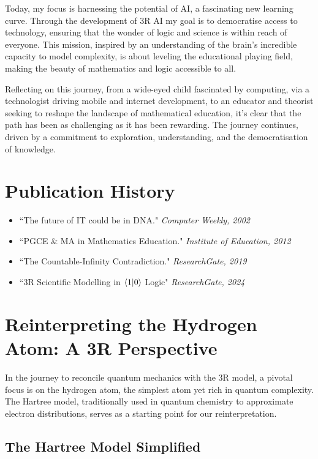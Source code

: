 \documentclass[12pt]{article}
\begin{document}
Today, my focus is harnessing the potential of AI, a fascinating new learning curve. Through the development of 3R AI my goal is to democratise access to technology, ensuring that the wonder of logic and science is within reach of everyone. This mission, inspired by an understanding of the brain's incredible capacity to model complexity, is about leveling the educational playing field, making the beauty of mathematics and logic accessible to all.

Reflecting on this journey, from a wide-eyed child fascinated by computing, via a technologist driving mobile and internet development, to an educator and theorist seeking to reshape the landscape of mathematical education, it's clear that the path has been as challenging as it has been rewarding. The journey continues, driven by a commitment to exploration, understanding, and the democratisation of knowledge.

\section*{Publication History}
\begin{itemize}
    \item \rDNA{} ``The future of IT could be in DNA." \textit{Computer Weekly, 2002}
    \item \rIoE{} ``PGCE \& MA in Mathematics Education." \textit{Institute of Education, 2012}
    \item \rCIC{} ``The Countable-Infinity Contradiction." \textit{ResearchGate, 2019}
    \item \rR{} ``3R Scientific Modelling in \(\langle 1 | 0 \rangle\) Logic" \textit{ResearchGate, 2024}
\end{itemize}


\section{Reinterpreting the Hydrogen Atom: A 3R Perspective}

In the journey to reconcile quantum mechanics with the 3R model, a pivotal focus is on the hydrogen atom, the simplest atom yet rich in quantum complexity. The Hartree model, traditionally used in quantum chemistry to approximate electron distributions, serves as a starting point for our reinterpretation.

\subsection{The Hartree Model Simplified}
\end{document}
